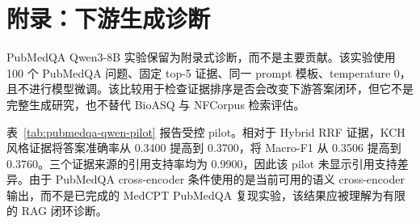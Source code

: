 \section{附录：下游生成诊断}

PubMedQA Qwen3-8B 实验保留为附录式诊断，而不是主要贡献。该实验使用 100 个 PubMedQA 问题、固定 top-5 证据、同一 prompt 模板、temperature 0，且不进行模型微调。该比较用于检查证据排序是否会改变下游答案闭环，但它不是完整生成研究，也不替代 BioASQ 与 NFCorpus 检索评估。

表~\ref{tab:pubmedqa-qwen-pilot} 报告受控 pilot。相对于 Hybrid RRF 证据，KCH 风格证据将答案准确率从 0.3400 提高到 0.3700，将 Macro-F1 从 0.3506 提高到 0.3760。三个证据来源的引用支持率均为 0.9900，因此该 pilot 未显示引用支持差异。由于 PubMedQA cross-encoder 条件使用的是当前可用的语义 cross-encoder 输出，而不是已完成的 MedCPT PubMedQA 复现实验，该结果应被理解为有限的 RAG 闭环诊断。


